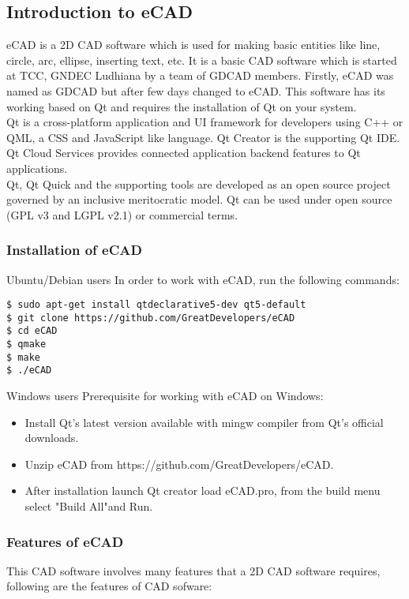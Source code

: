 \subsection{Introduction to eCAD}
eCAD is a 2D CAD software which is used for making basic entities like line, circle, arc, ellipse, inserting text, etc. It is a basic CAD software which is started at TCC, GNDEC Ludhiana by a team of GDCAD members. Firstly, eCAD was named as GDCAD but after few days changed to eCAD. This software has its working based on Qt and requires the installation of Qt on your system.\\

Qt is a cross-platform application and UI framework for developers using C++ or QML, a CSS and JavaScript like language. Qt Creator is the supporting Qt IDE. Qt Cloud Services provides connected application backend features to Qt applications.\\

Qt, Qt Quick and the supporting tools are developed as an open source project governed by an inclusive meritocratic model. Qt can be used under open source (GPL v3 and LGPL v2.1) or commercial terms.

\subsubsection{Installation of eCAD}
Ubuntu/Debian users In order to work with eCAD, run the following commands:\\

\begin{verbatim}
$ sudo apt-get install qtdeclarative5-dev qt5-default
$ git clone https://github.com/GreatDevelopers/eCAD
$ cd eCAD
$ qmake
$ make
$ ./eCAD
\end{verbatim}

\noindent Windows users Prerequisite for working with eCAD on Windows:\\

\begin{itemize}
\item Install Qt's latest version available with mingw compiler from Qt's official downloads.
\item Unzip eCAD from https://github.com/GreatDevelopers/eCAD.
\item After installation launch Qt creator load eCAD.pro, from the build menu select "Build All"and Run.
\end{itemize}

\subsubsection{Features of eCAD}
This CAD software involves many features that a 2D CAD software requires, following are the features of CAD sofware:\\

